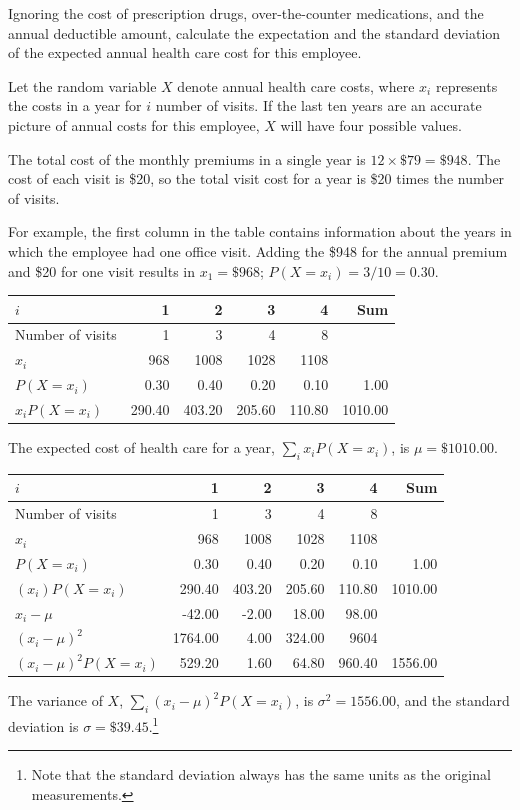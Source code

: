 \begin{example} {Ignoring the cost of prescription drugs, over-the-counter medications, and the annual deductible amount, calculate the expectation and the standard deviation of the expected annual health care cost for this employee.}  
	
	Let the random variable $X$ denote annual health care costs, where $x_i$ represents the costs in a year for $i$ number of visits. If the last ten years are an accurate picture of annual costs for this employee, $X$ will have four possible values. 
	
	The total cost of the monthly premiums in a single year is $12 \times \$79 = \$948$. The cost of each visit is \$20, so the total visit cost for a year is \$20 times the number of visits. 
	
	For example, the first column in the table contains information about the years in which the employee had one office visit. Adding the \$948 for the annual premium and \$20 for one visit results in $x_{1}=\$968$; $P(X=x_{i}) = 3/10 = 0.30$.
	
	\begin{center}
		\begin{tabular}{l rrrr r}
			\hline
			$i$ & 1 & 2 & 3 & 4 & Sum \\
			\hline
			Number of visits & 1 & 3 & 4 & 8 &\\
			$x_i$ & 968 & 1008 & 1028 & 1108 &  \\
			$P(X=x_i)$ & 0.30 & 0.40 & 0.20 & 0.10 & 1.00 \\
			$x_i P(X=x_i)$ & 290.40 & 403.20 & 205.60 & 110.80 & 1010.00 \\
			\hline
		\end{tabular}
	\end{center}
	The expected cost of health care for a year, $\sum_i x_i P(X = x_i)$, is $\mu=\$1010.00$.
	\begin{center}
		\begin{tabular}{l rrrr r}
			\hline
			$i$ & 1 & 2 & 3 & 4 & Sum \\
			\hline
			Number of visits & 1 & 3 & 4 & 8 &\\
			$x_i$ & 968 & 1008 & 1028 & 1108 &  \\
			$P(X=x_i)$ & 0.30 & 0.40 & 0.20 & 0.10 & 1.00 \\
			$(x_i)P(X=x_i)$ & 290.40 & 403.20 & 205.60 & 110.80 & 1010.00 \\
			\hline
			$x_i - \mu$ & -42.00  & -2.00  & 18.00  & 98.00 & \\
			$(x_i - \mu)^2$ &  1764.00 & 4.00  & 324.00  & 9604 & \\
			$(x_i - \mu)^2 P(X=x_i)$ & 529.20  & 1.60  & 64.80  & 960.40 & 1556.00\\
			\hline
		\end{tabular}
	\end{center}
	The variance of $X$, $\sum_i (x_i - \mu)^2 P(X = x_i)$,  is $\sigma^2 = 1556.00$, and the standard deviation is $\sigma = \$39.45$.\footnote{Note that the standard deviation always has the same units as the original measurements.}
	
\end{example}

